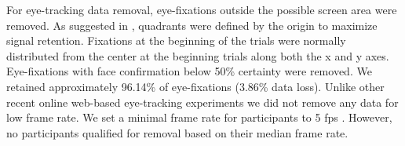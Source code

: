 For eye-tracking data removal, eye-fixations outside the possible screen area were removed. As suggested in \cite{bramlett_wiener_24-AOW}, quadrants were defined by the origin to maximize signal retention. Fixations at the beginning of the trials were normally distributed from the center at the beginning trials along both the x and y axes. Eye-fixations with face confirmation below 50\% certainty were removed. We retained approximately 96.14\% of eye-fixations (3.86\% data loss). Unlike other recent online web-based eye-tracking experiments we did not remove any data for low frame rate. We set a minimal frame rate for participants to 5 fps \citep{Vos_2017}. However, no participants qualified for removal based on their median frame rate. 


